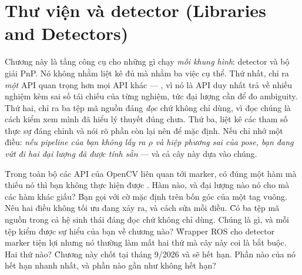 \documentclass[../../marker.tex]{subfiles}
\begin{document}
\chapter{Thư viện và detector (Libraries and Detectors)}

\begin{tomtat}
Chương này là tầng công cụ cho những gì chạy \emph{mỗi khung hình}: detector và bộ giải PnP. Nó không nhằm liệt kê đủ mà nhằm ba việc cụ thể. Thứ nhất, chỉ ra \emph{một} API quan trọng hơn mọi API khác --- , vì nó là API duy nhất trả về nhiều nghiệm kèm sai số tái chiếu của từng nghiệm, tức đại lượng cần để đo ambiguity. Thứ hai, chỉ ra ba tệp mã nguồn đáng \emph{đọc} chứ không chỉ dùng, vì đọc chúng là cách kiểm xem mình đã hiểu lý thuyết đúng chưa. Thứ ba, liệt kê các tham số thực sự đáng chỉnh và nói rõ phần còn lại nên để mặc định. Nếu chỉ nhớ một điều: \emph{nếu pipeline của bạn không lấy ra \(\rho\) và hiệp phương sai của pose, bạn đang vứt đi hai đại lượng đã được tính sẵn} --- và cả cây này dựa vào chúng.
\end{tomtat}

\begin{nentang}
\end{nentang}

\begin{khoigoi}
\h{Trong toàn bộ các API của OpenCV liên quan tới marker, có đúng một hàm mà thiếu nó thì bạn không thực hiện được . Hàm nào, và đại lượng nào nó cho mà các hàm khác giấu?}
\h{Bạn gọi  với cờ mặc định trên bốn góc của một tag vuông. Nêu hai điều không tối ưu đang xảy ra, và cách sửa mỗi điều.}
\h{Có ba tệp mã nguồn trong cả hệ sinh thái đáng đọc chứ không chỉ dùng. Chúng là gì, và mỗi tệp kiểm được sự hiểu của bạn về chương nào?}
\h{Wrapper ROS cho detector marker tiện lợi nhưng nó thường làm mất hai thứ mà cây này coi là bắt buộc. Hai thứ nào?}
\h{Chương này chốt tại tháng 9/2026 và sẽ hết hạn. Phần nào của nó hết hạn nhanh nhất, và phần nào gần như không hết hạn?}
\end{khoigoi}
\end{document}
